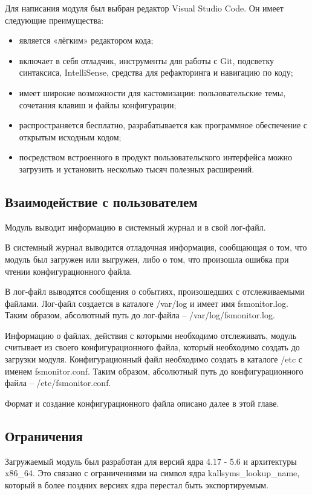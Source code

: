 \documentclass[a4paper,14pt]{article}
\begin{document}
Для написания модуля был выбран редактор Visual Studio Code. Он имеет следующие преимущества:

\begin{itemize}
	\item является «лёгким» редактором кода;
	\item включает в себя отладчик, инструменты для работы с Git, подсветку синтаксиса, IntelliSense,  средства для рефакторинга и навигацию по коду;
	\item имеет широкие возможности для кастомизации: пользовательские темы, сочетания клавиш и файлы конфигурации;
	\item распространяется бесплатно, разрабатывается как программное обеспечение с открытым исходным кодом;
	\item посредством встроенного в продукт пользовательского интерфейса можно загрузить и установить несколько тысяч полезных расширений.
\end{itemize}

\subsection{Взаимодействие с пользователем}

Модуль выводит информацию в системный журнал и в свой лог-файл.

В системный журнал выводится отладочная информация, сообщающая о том, что модуль был загружен или выгружен, либо о том, что произошла ошибка при чтении конфигурационного файла.

В лог-файл выводятся сообщения о событиях, произошедших с отслеживаемыми файлами. Лог-файл создается в каталоге /var/log и имеет имя fsmonitor.log. Таким образом, абсолютный путь до лог-файла -- /var/log/fsmonitor.log.

Информацию о файлах, действия с которыми необходимо отслеживать, модуль считывает из своего конфигурационного файла, который необходимо создать до загрузки модуля.  Конфигурационный файл необходимо создать в каталоге /etc с именем fsmonitor.conf. Таким образом, абсолютный путь до конфигурационного файла -- /etc/fsmonitor.conf.

Формат и создание конфигурационного файла описано далее в этой главе.

\subsection{Ограничения}

Загружаемый модуль был разработан для версий ядра 4.17 - 5.6 и архитектуры x86\_64. Это связано с ограничениями на символ ядра kallsyms\_lookup\_name, который в более поздних версиях ядра перестал быть экспортируемым.
\end{document}
